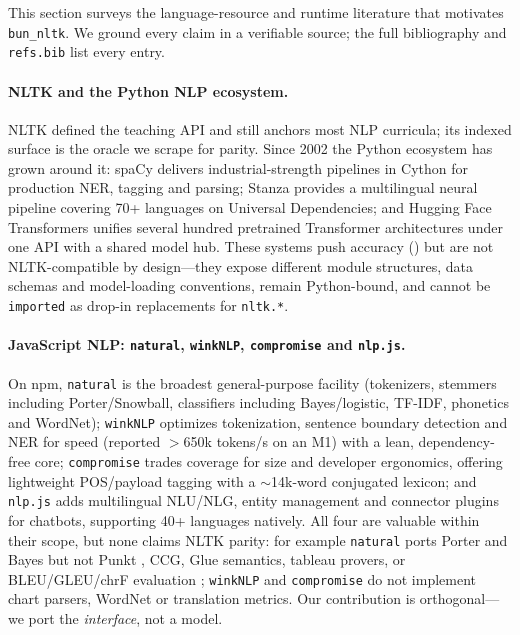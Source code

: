 \documentclass[smallextended]{svjour3}
\begin{document}
This section surveys the language-resource and runtime literature that motivates \texttt{bun\_nltk}. We ground every claim in a verifiable source; the full bibliography and \texttt{refs.bib} list every entry.

\paragraph{NLTK and the Python NLP ecosystem.}
NLTK \cite{bird2009nltk,loper2002nltk} defined the teaching API and still anchors most NLP curricula; its indexed surface \cite{nltk2024} is the oracle we scrape for parity. Since 2002 the Python ecosystem has grown around it: spaCy \cite{spacy2023} delivers industrial-strength pipelines in Cython for production NER, tagging and parsing; Stanza \cite{stanza2020} provides a multilingual neural pipeline covering 70+ languages on Universal Dependencies; and Hugging Face Transformers \cite{wolf2020transformers} unifies several hundred pretrained Transformer architectures under one API with a shared model hub. These systems push accuracy (\cite{spacy2023,stanza2020,wolf2020transformers}) but are not NLTK-compatible by design---they expose different module structures, data schemas and model-loading conventions, remain Python-bound, and cannot be \texttt{imported} as drop-in replacements for \texttt{nltk.*}.

\paragraph{JavaScript NLP: \texttt{natural}, \texttt{winkNLP}, \texttt{compromise} and \texttt{nlp.js}.}
On npm, \texttt{natural} \cite{natural2024} is the broadest general-purpose facility (tokenizers, stemmers including Porter/Snowball, classifiers including Bayes/logistic, TF-IDF, phonetics and WordNet); \texttt{winkNLP} \cite{winknlp2024} optimizes tokenization, sentence boundary detection and NER for speed (reported $>$650k tokens/s on an M1) with a lean, dependency-free core; \texttt{compromise} \cite{compromise2024} trades coverage for size and developer ergonomics, offering lightweight POS/payload tagging with a $\sim$14k-word conjugated lexicon; and \texttt{nlp.js} \cite{nlpjs2024} adds multilingual NLU/NLG, entity management and connector plugins for chatbots, supporting 40+ languages natively. All four are valuable within their scope, but none claims NLTK parity: for example \texttt{natural} ports Porter and Bayes but not Punkt \cite{bird2009nltk}, CCG, Glue semantics, tableau provers, or BLEU/GLEU/chrF evaluation \cite{nltk2024}; \texttt{winkNLP} and \texttt{compromise} do not implement chart parsers, WordNet or translation metrics. Our contribution is orthogonal---we port the \emph{interface}, not a model.
\end{document}
